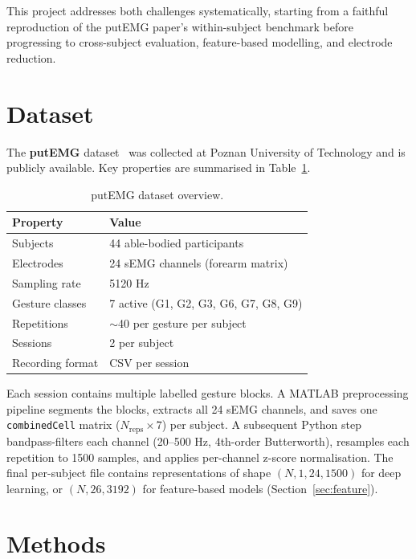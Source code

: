 \documentclass[11pt,twocolumn]{article}
\begin{document}
This project addresses both challenges systematically, starting from a faithful
reproduction of the putEMG paper's within-subject benchmark before progressing to
cross-subject evaluation, feature-based modelling, and electrode reduction.

\section{Dataset}

The \textbf{putEMG} dataset~\cite{kaczmarek2019putemg} was collected at Poznan
University of Technology and is publicly available. Key properties are summarised
in Table~\ref{tab:dataset}.

\begin{table}[h]
\centering
\caption{putEMG dataset overview.}
\label{tab:dataset}
\begin{tabular}{ll}
\toprule
\textbf{Property} & \textbf{Value} \\
\midrule
Subjects          & 44 able-bodied participants \\
Electrodes        & 24 sEMG channels (forearm matrix) \\
Sampling rate     & 5120 Hz \\
Gesture classes   & 7 active (G1, G2, G3, G6, G7, G8, G9) \\
Repetitions       & $\sim$40 per gesture per subject \\
Sessions          & 2 per subject \\
Recording format  & CSV per session \\
\bottomrule
\end{tabular}
\end{table}

Each session contains multiple labelled gesture blocks. A MATLAB preprocessing
pipeline segments the blocks, extracts all 24 sEMG channels, and saves one
\texttt{combinedCell} matrix ($N_\text{reps} \times 7$) per subject. A subsequent
Python step bandpass-filters each channel (20--500 Hz, 4th-order Butterworth),
resamples each repetition to 1500 samples, and applies per-channel z-score
normalisation. The final per-subject file contains representations of shape
$(N, 1, 24, 1500)$ for deep learning, or $(N, 26, 3192)$ for feature-based models
(Section~\ref{sec:feature}).

\section{Methods}
\end{document}
